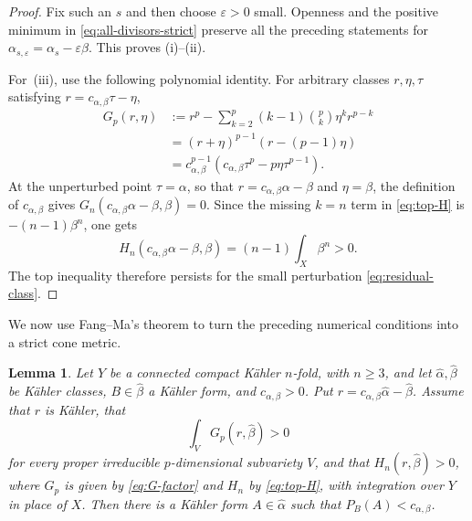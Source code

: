 \documentclass[reqno]{amsart}
\newcommand{\cab}{c_{\alpha,\beta}}
\theoremstyle{plain}
\newtheorem{lemma}[thm]{Lemma}
\theoremstyle{remark}
\begin{document}
\begin{proof}
Fix such an \(s\) and then choose \(\varepsilon>0\) small.  Openness and
the positive minimum in \eqref{eq:all-divisors-strict} preserve all the
preceding statements for
\(\alpha_{s,\varepsilon}=\alpha_s-\varepsilon\beta\).  This proves
\textup{(i)}--\textup{(ii)}.

For~\textup{(iii)}, use the following polynomial identity. For arbitrary
classes $r,\eta,\tau$ satisfying $r=\cab\tau-\eta$,
\begin{equation}\label{eq:G-factor}
\begin{split}
 G_p(r,\eta)
 &:=
 r^p-\sum_{k=2}^{p}(k-1)\binom pk
       \eta^kr^{p-k}\\
 &=(r+\eta)^{p-1}(r-(p-1)\eta)\\
 &=\cab^{p-1}(\cab\tau^p-p\eta\tau^{p-1}).
\end{split}
\end{equation}
At the unperturbed point $\tau=\alpha$, so that
$r=\cab\alpha-\beta$ and $\eta=\beta$, the definition of $\cab$
gives $G_n(\cab\alpha-\beta,\beta)=0$. Since the missing
$k=n$ term in \eqref{eq:top-H} is
$-(n-1)\beta^n$, one gets
\[
 H_n(\cab\alpha-\beta,\beta)=(n-1)\int_X\beta^n>0.
\]
The top inequality therefore persists for the small perturbation
\eqref{eq:residual-class}.
\end{proof}
We now use Fang--Ma's theorem \cite[Theorem~1.10]{FM24} to turn the
preceding numerical conditions into a strict cone metric.

\begin{lemma}\label{lem:FangMa}
Let $Y$ be a connected compact K\"ahler $n$-fold, with $n\geq3$,
and let
$\widehat\alpha,\widehat\beta$ be K\"ahler classes,
$B\in\widehat\beta$ a K\"ahler form, and $\cab>0$.  Put
$r=\cab\widehat\alpha-\widehat\beta$.
Assume that $r$ is K\"ahler, that
\[
 \int_V G_p(r,\widehat\beta)>0
\]
for every proper irreducible $p$-dimensional subvariety $V$, and
that $H_n(r,\widehat\beta)>0$, where $G_p$ is given by
\eqref{eq:G-factor} and $H_n$ by \eqref{eq:top-H}, with integration
over $Y$ in place of $X$.  Then there is a K\"ahler
form $A\in\widehat\alpha$ such that $P_B(A)<\cab$.
\end{lemma}
\end{document}
